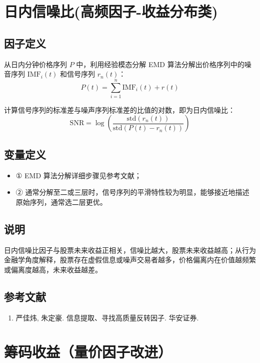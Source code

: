 \documentclass{article}
\begin{document}
\section{日内信噪比(高频因子-收益分布类)}

\subsection{因子定义}
从日内分钟价格序列 \( P \) 中，利用经验模态分解 EMD 算法分解出价格序列中的噪音序列 \( \mathrm{IMF}_i(t) \) 和信号序列 \( r_n(t) \)：
\begin{equation}
    P(t) = \sum_{i=1}^n \mathrm{IMF}_i(t) + r(t)
\end{equation}

计算信号序列的标准差与噪声序列标准差的比值的对数，即为日内信噪比：
\begin{equation}
    \mathrm{SNR} = \log \left( \frac{\mathrm{std}(r_n(t))}{\mathrm{std}(P(t) - r_n(t))} \right)
\end{equation}

\subsection{变量定义}
\begin{itemize}
    \item ① EMD 算法分解详细步骤见参考文献；
    \item ② 通常分解至二或三层时，信号序列的平滑特性较为明显，能够接近地描述原始序列，通常选二层更优。
\end{itemize}

\subsection{说明}
日内信噪比因子与股票未来收益正相关，信噪比越大，股票未来收益越高；从行为金融学角度解释，股票存在虚假信息或噪声交易者越多，价格偏离内在价值越频繁或偏离度越高，未来收益越差。

\subsection{参考文献}
\begin{enumerate}
    \item 严佳炜, 朱定豪. 信息提取、寻找高质量反转因子. 华安证券.
\end{enumerate}

\section{筹码收益（量价因子改进）}
\end{document}

